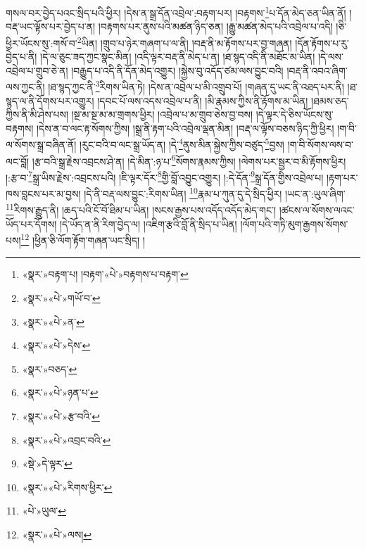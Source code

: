 གསལ་བར་བྱེད་པའང་སྲིད་པའི་ཕྱིར། །དེས་ན་སྒྲ་དོན་འབྲེལ་:བརྟག་པར། །བརྟགས་\footnote{«སྣར་»བརྟག་པ། །བརྟག་«པེ་»བརྟགས་པ་བརྟག་}པ་དོན་མེད་ཅན་ཡིན་ནོ། །བརྡ་ཡང་ལྟོས་པར་བྱེད་པ་ན། །བརྟགས་པར་ནུས་པའི་མཚན་ཉིད་ཅན། །རྒྱུ་མཚན་མེད་པའི་འབྲེལ་པ་འདི། །ཅི་ཕྱིར་ཡོངས་སུ་:གསོ་བ་\footnote{«སྣར་»«པེ་»གཡོ་བ་}ཡིན། །གྲུབ་པ་ཉེར་གཞག་པ་ལ་ནི། །བརྡ་ནི་མ་རྟོགས་པར་བྱ་གཞན། །དོན་རྟོགས་པ་རུ་བྱེད་པ་ནི། །དེ་ལ་ཅུང་ཟད་ཀྱང་སྣང་མིན། །འདི་ལྟར་བརྡ་ནི་མེད་པ་ན། །ཐ་སྙད་འདི་ནི་མཐོང་མ་ཡིན། །དེ་ལས་འབྲེལ་པ་གྲུབ་ཅེ་ན། །བརྒྱུད་པ་འདི་ནི་དོན་མེད་འགྱུར། །སྐྱེས་བུ་འདོད་ཙམ་ལས་བྱུང་བའི། །བརྡ་ནི་འབའ་ཞིག་ལས་ཀྱང་ནི། །ཐ་སྙད་ཀྱང་ནི་\footnote{«སྣར་»«པེ་»ན་}རིགས་ཡིན་ཏེ། །དེས་ན་འབྲེལ་པ་མི་འགྲུབ་པོ། །གཞན་དུ་ཡང་ནི་འཐད་པར་ནི། །ཐ་སྙད་ལ་ནི་དོགས་པར་འགྱུར། །དབང་པོ་ལས་འདས་འབྲེལ་པ་ནི། །མི་རྣམས་ཀྱིས་ནི་རྟོགས་མ་ཡིན། །ཐམས་ཅད་ཀྱིས་ནི་མི་ཤེས་པས། །སྔ་མ་སྔ་མ་མ་གྲགས་ཕྱིར། །འབྲེལ་པ་མ་གྲུབ་ཅེས་བྱ་བས། །དེ་ལྟར་དེ་ཅིས་ཡོངས་སུ་བརྟགས། །དེས་ན་བ་ལང་རྟ་སོགས་ཀྱིས། །སྒྲ་ནི་རྟག་པའི་འབྲེལ་ལྡན་མིན། །བརྡ་ལ་ལྟོས་བཅས་ཉིད་ཀྱི་ཕྱིར། །ག་བི་ལ་སོགས་སྒྲ་བཞིན་ནོ། །རུང་བའི་བ་ལང་སྒྲ་ཡོད་ན། །དེ་\footnote{«སྣར་»«པེ་»དེས་}ནུས་མིན་སྐྱེས་ཀྱིས་བཙུད་\footnote{«སྣར་»བཅད་}བྱས། །ག་བི་སོགས་ལས་བ་ལང་བློ། །རྩ་བའི་སྒྲ་རྗེས་འབྲངས་ཤེ་ན། །དེ་མིན་:ཉ་པ་\footnote{«སྣར་»«པེ་»ཉན་པ་}སོགས་རྣམས་ཀྱིས། །ལེགས་པར་སྦྱར་བ་མི་རྟོགས་ཕྱིར། །:རྩ་བ་\footnote{«སྣར་»«པེ་»རྩ་བའི་}སྒྲ་ཡིས་རྗེས་:འབྲངས་པའི། །ཇི་ལྟར་དོར་\footnote{«སྣར་»«པེ་»འབྲང་བའི་}གྱི་བློ་འབྱུང་འགྱུར། །:དེ་དོན་\footnote{«སྡེ་»དེ་ལྟར་}སྒྲ་དོན་གྱིས་འབྲེལ་པ། །རྟག་པར་ཁས་བླངས་པར་མ་བྱས། །དེ་ནི་བརྡ་ལས་བྱུང་:རིགས་ཡིན། \footnote{«སྣར་»«པེ་»རིགས་ཕྱིར་}རྣམ་པ་ཀུན་དུ་དེ་སྲིད་ཕྱིར། །ཡང་ན་:ཡུལ་ཞིག་\footnote{«པེ་»ཡུལ་}རིགས་རྒྱུད་ནི། །ཆད་པའི་ངོ་བོ་ཐིམ་པ་ཡིན། །སངས་རྒྱས་པས་འདོད་འདོད་མེད་གང་། །ཚངས་ལ་སོགས་ལའང་ཡོད་པར་དོགས། །དེ་ཡོད་ན་ནི་རིག་བྱེད་ལ། །འཇིག་རྩའི་བློ་ནི་སྲིད་པ་ཡིན། །ལོག་པའི་གཏི་མུག་རྒྱགས་སོགས་པས།\footnote{«སྣར་»«པེ་»ལས།} །ཕྱིན་ཅི་ལོག་རྟོག་གཞན་ཡང་སྲིད། །
